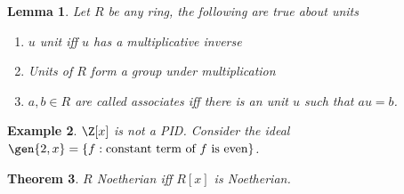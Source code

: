 \documentclass[a4paper,12pt]{article}
\newtheorem{thm}{Theorem}[section]
\newtheorem{lem}[thm]{Lemma}
\newtheorem{eg}[thm]{Example}
\begin{document}
\begin{lem}
    Let $R$ be any ring, the following are true about units
    \begin{enumerate}
        \item $u$ unit iff $u$ has a multiplicative inverse
        \item Units of $R$ form a group under multiplication 
        \item $a,b\in R$ are called associates iff there is an unit $u$ such that $au=b$. 
    \end{enumerate}
\end{lem}
\begin{eg}
    $\Z[x]$ is not a PID. Consider the ideal $\gen{2,x}= \{f: \text{constant term of $f$ is even}\}$.  
\end{eg}
\begin{thm}
    $R$ Noetherian iff $R[x]$ is Noetherian. 
\end{thm}
\newpage
\end{document}
